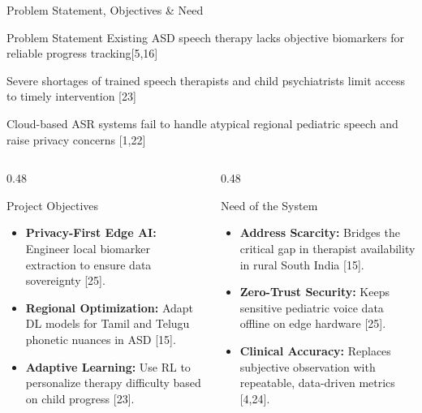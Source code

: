 \documentclass[aspectratio=169, 11pt]{beamer}
\begin{document}
\begin{frame}{Problem Statement, Objectives \& Need}
    \vspace{-2mm}
    \begin{block}{\small Problem Statement}
        \small \centering
       Existing ASD speech therapy lacks objective biomarkers for reliable progress tracking[5,16]

Severe shortages of trained speech therapists and child psychiatrists limit access to timely intervention [23]

Cloud-based ASR systems fail to handle atypical regional pediatric speech and raise privacy concerns [1,22]
    \end{block}

    \vspace{2mm}

    \begin{columns}[T, totalwidth=\textwidth]
        \begin{column}{0.48\textwidth}
            \begin{block}{\small Project Objectives}
                \scriptsize
                \begin{itemize}
                    \setlength{\itemsep}{5pt}
                    \item \textbf{Privacy-First Edge AI:} Engineer local biomarker extraction to ensure data sovereignty [25].
                    \item \textbf{Regional Optimization:} Adapt DL models for Tamil and Telugu phonetic nuances in ASD [15].
                    \item \textbf{Adaptive Learning:} Use RL to personalize therapy difficulty based on child progress [23].
                \end{itemize}
            \end{block}
        \end{column}

        \begin{column}{0.48\textwidth}
            \begin{block}{\small Need of the System}
                \scriptsize
                \begin{itemize}
                    \setlength{\itemsep}{5pt}
                    \item \textbf{Address Scarcity:} Bridges the critical gap in therapist availability in rural South India [15].
                    \item \textbf{Zero-Trust Security:} Keeps sensitive pediatric voice data offline on edge hardware [25].
                    \item \textbf{Clinical Accuracy:} Replaces subjective observation with repeatable, data-driven metrics [4,24].
                \end{itemize}
            \end{block}
        \end{column}
    \end{columns}
\end{frame}
\end{document}
